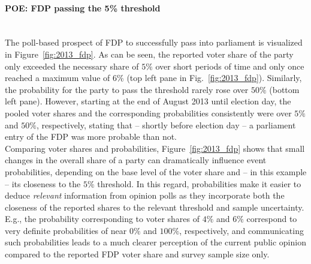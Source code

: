 \documentclass[smallcondensed]{svjour3}     %
\begin{document}
\paragraph{POE: FDP passing the 5\% threshold} \ \\
The poll-based prospect of FDP to successfully pass into parliament is visualized
in Figure~\ref{fig:2013_fdp}.
As can be seen, the reported voter share of the party only exceeded the necessary share
of $5\%$ over short periods of time and only once reached a maximum value
of $6\%$ (top left pane in Fig.~\ref{fig:2013_fdp}). Similarly, the probability
for the party to pass the threshold rarely rose over $50\%$ (bottom left pane).
However, starting at the end of August 2013 until election day, the pooled voter
shares and the corresponding probabilities consistently were over $5\%$ and $50\%$,
respectively, stating that -- shortly before election day -- a parliament entry
of the FDP was more probable than not.\\

Comparing voter shares and probabilities, Figure~\ref{fig:2013_fdp} shows
that small changes in the overall share of a party can dramatically influence
event probabilities, depending on the base level of the voter share and
-- in this example -- its closeness to the $5\%$ threshold.
In this regard, probabilities make it easier to deduce {\it relevant} information
from opinion polls as they incorporate both the closeness of the reported shares
to the relevant threshold and sample uncertainty.
E.g., the probability corresponding to voter shares of $4\%$ and $6\%$ correspond to
very definite probabilities of near $0\%$ and $100\%$, respectively,
and communicating such probabilities leads to a much clearer perception of
the current public opinion compared to the reported FDP voter share and
survey sample size only.
\end{document}
